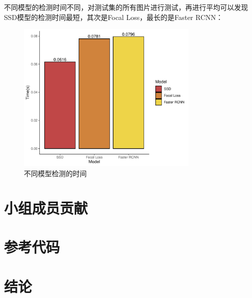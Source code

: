 \documentclass[journal,transmag]{IEEEtran}
\begin{document}
不同模型的检测时间不同，对测试集的所有图片进行测试，再进行平均可以发现SSD模型的检测时间最短，其次是Focal Loss，最长的是Faster RCNN：
\begin{figure}[h]
\centering
\includegraphics[width=3.44in]{time.pdf}
\caption{不同模型检测的时间}
\end{figure}

\section{小组成员贡献}

\section{参考代码}

\section{结论}



%
%
\end{document}
